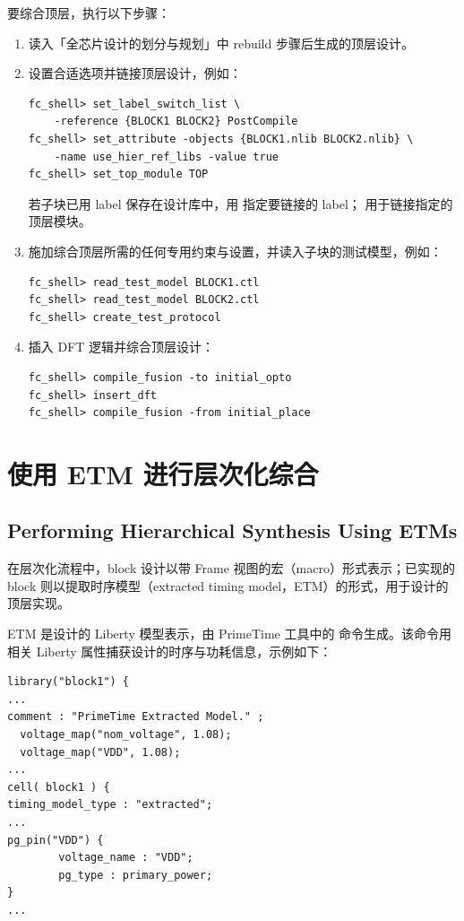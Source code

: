 要综合顶层，执行以下步骤：
\begin{enumerate}
  \item 读入「全芯片设计的划分与规划」中 rebuild 步骤后生成的顶层设计。
  \item 设置合适选项并链接顶层设计，例如：
\begin{lstlisting}
fc_shell> set_label_switch_list \
    -reference {BLOCK1 BLOCK2} PostCompile
fc_shell> set_attribute -objects {BLOCK1.nlib BLOCK2.nlib} \
    -name use_hier_ref_libs -value true
fc_shell> set_top_module TOP
\end{lstlisting}
若子块已用 label 保存在设计库中，用  指定要链接的 label； 用于链接指定的顶层模块。
  \item 施加综合顶层所需的任何专用约束与设置，并读入子块的测试模型，例如：
\begin{lstlisting}
fc_shell> read_test_model BLOCK1.ctl
fc_shell> read_test_model BLOCK2.ctl
fc_shell> create_test_protocol
\end{lstlisting}
  \item 插入 DFT 逻辑并综合顶层设计：
\begin{lstlisting}
fc_shell> compile_fusion -to initial_opto
fc_shell> insert_dft
fc_shell> compile_fusion -from initial_place
\end{lstlisting}
\end{enumerate}

\section{使用 ETM 进行层次化综合}
\subsection*{Performing Hierarchical Synthesis Using ETMs}

在层次化流程中，block 设计以带 Frame 视图的宏（macro）形式表示；已实现的 block 则以提取时序模型（extracted timing model，ETM）的形式，用于设计的顶层实现。

ETM 是设计的 Liberty 模型表示，由 PrimeTime 工具中的 \cmd{extract\_model} 命令生成。该命令用相关 Liberty 属性捕获设计的时序与功耗信息，示例如下：
\begin{lstlisting}
library("block1") {
...
comment : "PrimeTime Extracted Model." ;
  voltage_map("nom_voltage", 1.08);
  voltage_map("VDD", 1.08);
...
cell( block1 ) {
timing_model_type : "extracted";
...
pg_pin("VDD") {
        voltage_name : "VDD";
        pg_type : primary_power;
}
...
\end{lstlisting}

